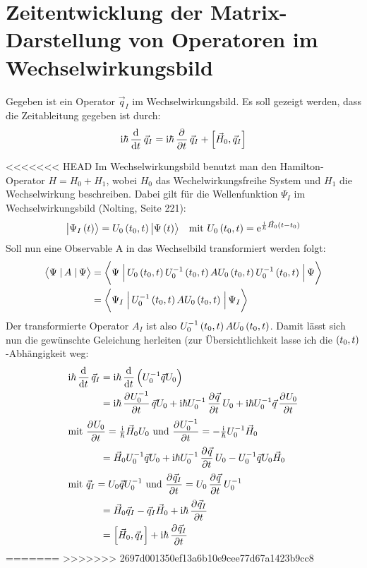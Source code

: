 \section{Zeitentwicklung der Matrix-Darstellung von Operatoren im Wechselwirkungsbild}

Gegeben ist ein Operator $\vec{q}_I$ im Wechselwirkungsbild. Es soll gezeigt werden, dass die Zeitableitung gegeben ist durch:
\[
	\ii\hbar\dod{}{t}\vec{q}_I=\ii\hbar\dpd{}{t}\vec{q}_I+\left[\vec{H}_0,\vec{q}_I\right]
\]

<<<<<<< HEAD
Im Wechselwirkungsbild benutzt man den Hamilton-Operator $H=H_0+H_1$, wobei $H_0$ das Wechelwirkungsfreihe System und $H_1$ die Wechselwirkung beschreiben. Dabei gilt für die Wellenfunktion $\Psi_I$ im Wechselwirkungsbild (Nolting, Seite 221):
\begin{align*}
	\ket{\Psi_I\del{t}}=U_0\del{t_0,t}\ket{\Psi\del{t}}&&\text{mit }U_0\del{t_0,t}=\ee^{\frac{\ii}{\hbar}\vec{H}_0\del{t-t_0}}
\end{align*}
Soll nun eine Observable A in das Wechselbild transformiert werden folgt:
\begin{align*}
	\braopket{\Psi}{A}{\Psi}&=\braopket{\Psi}{U_0\del{t_0,t}U_0^{-1}\del{t_0,t}AU_0\del{t_0,t}U_0^{-1}\del{t_0,t}}{\Psi}\\
	&=\braopket{\Psi_I}{U_0^{-1}\del{t_0,t}AU_0\del{t_0,t}}{\Psi_I}\\
\end{align*}
Der transformierte Operator $A_I$ ist also $U_0^{-1}\del{t_0,t}AU_0\del{t_0,t}$. Damit lässt sich nun die gewünschte Geleichung herleiten (zur Übersichtlichkeit lasse ich die $\del{t_0,t}$-Abhängigkeit weg:
\begin{align*}
	\ii\hbar\dod{}{t}\vec{q}_I&=\ii\hbar\dod{}{t}\del{U_0^{-1}\vec{q}U_0}\\
	&=\ii\hbar\dpd{U_0^{-1}}{t}\vec{q}U_0+\ii\hbar U_0^{-1}\dpd{\vec{q}}{t}U_0+\ii\hbar U_0^{-1}\vec{q}\dpd{U_0}{t}\\
	\intertext{%
		mit $\dpd{U_0}{t}=\frac{\ii}{\hbar}\vec{H}_0U_0$ und $\dpd{U_0^{-1}}{t}=-\frac{\ii}{\hbar}U_0^{-1}\vec{H}_0$
	}
	&=\vec{H}_0U_0^{-1}\vec{q}U_0+\ii\hbar U_0^{-1}\dpd{\vec{q}}{t}U_0-U_0^{-1}\vec{q}U_0\vec{H}_0\\
	\intertext{%
		mit $\vec{q}_I=U_0\vec{q}U_0^{-1}$ und $\dpd{\vec{q}_I}{t}=U_0\dpd{\vec{q}}{t}U_0^{-1}$
	}
	&=\vec{H}_0\vec{q}_I-\vec{q}_I\vec{H}_0+\ii\hbar\dpd{\vec{q}_I}{t}\\
	&=\left[\vec{H}_0,\vec{q}_I\right]+\ii\hbar\dpd{\vec{q}_I}{t}
\end{align*}
=======
>>>>>>> 2697d001350ef13a6b10e9cee77d67a1423b9cc8


